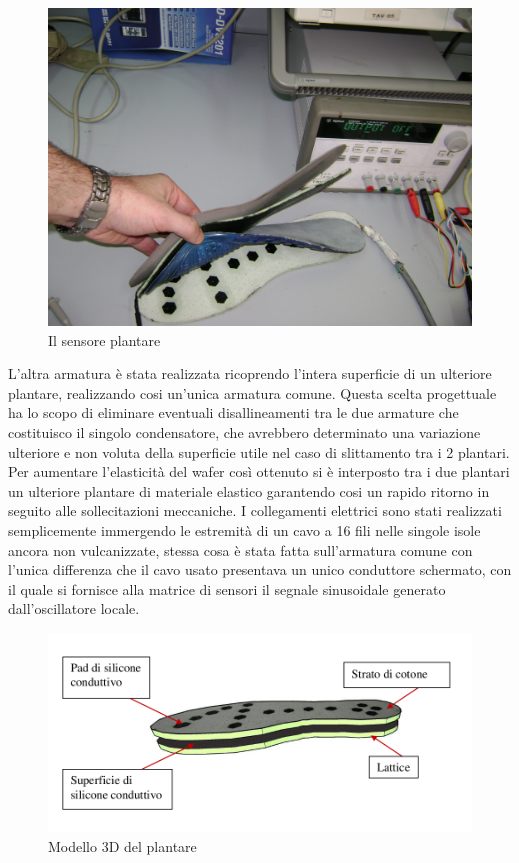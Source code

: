 \documentclass[12pt,a4paper,oneside,openright,italian]{article}
\begin{document}
\begin{figure}[!hbp]
  \centering
  \includegraphics[width=320pt]{immagini/dsc00675.jpg}
  \caption{Il sensore plantare}
  \label{sensore}
\end{figure}

L'altra armatura \`e stata realizzata ricoprendo l'intera superficie di un ulteriore plantare, realizzando cosi un'unica armatura comune. Questa scelta progettuale ha lo scopo di eliminare eventuali disallineamenti tra le due armature che costituisco il singolo condensatore, che avrebbero determinato una variazione ulteriore e non voluta della superficie utile nel caso di slittamento tra i 2 plantari. 
\newline
Per aumentare l'elasticit\`a del wafer cos\`i ottenuto si \`e interposto tra i due plantari un ulteriore plantare di materiale elastico garantendo cosi un rapido ritorno in seguito alle sollecitazioni meccaniche. I collegamenti elettrici sono stati realizzati semplicemente immergendo le estremit\`a di un cavo a 16 fili nelle singole isole ancora non vulcanizzate,  stessa cosa \`e stata fatta sull'armatura comune con l'unica differenza che il cavo usato presentava un unico conduttore schermato, con il quale si fornisce alla matrice di sensori il segnale sinusoidale generato dall'oscillatore locale.
\begin{figure}[!hbp]
  \centering
  \includegraphics[width=350pt]{immagini/plantare.png}
  \caption{Modello 3D del plantare}
  \label{plantare3d}
\end{figure}
\end{document}
